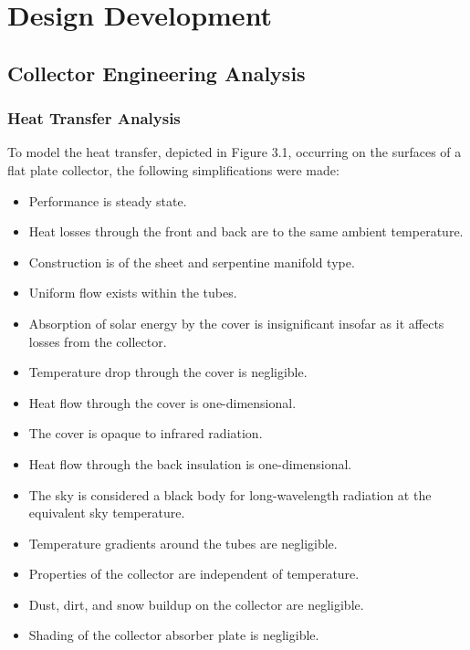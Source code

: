\chapter{Design Development}

\section{Collector Engineering Analysis}

\subsection{Heat Transfer Analysis}

To model the heat transfer, depicted in Figure 3.1, occurring on the surfaces of a flat plate collector, the following simplifications were made:

\medskip
\begin{itemize}[itemsep=3mm, parsep=-1mm]
    \item Performance is steady state. 
    \item Heat losses through the front and back are to the same ambient temperature.
    \item Construction is of the sheet and serpentine manifold type.
    \item Uniform flow exists within the tubes.
    \item Absorption of solar energy by the cover is insignificant insofar as it affects losses from the collector. 
    \item Temperature drop through the cover is negligible. 
    \item Heat flow through the cover is one-dimensional.
    \item The cover is opaque to infrared radiation. 
    \item Heat flow through the back insulation is one-dimensional. 
    \item The sky is considered a black body for long-wavelength radiation at the equivalent sky temperature.
    \item Temperature gradients around the tubes are negligible. 
    \item Properties of the collector are independent of temperature. 
    \item Dust, dirt, and snow buildup on the collector are negligible. 
    \item Shading of the collector absorber plate is negligible.
\end{itemize}

